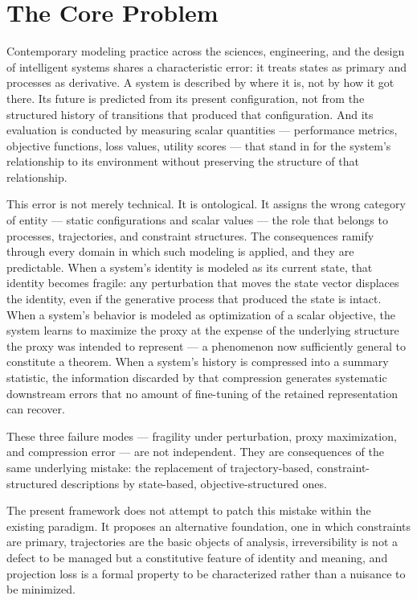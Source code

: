 \documentclass[12pt, twoside]{article}
\theoremstyle{plain}
\theoremstyle{definition}
\theoremstyle{remark}
\begin{document}
\section{The Core Problem}

Contemporary modeling practice across the sciences, engineering,
and the design of intelligent systems shares a characteristic error:
it treats states as primary and processes as derivative.
A system is described by where it is, not by how it got there.
Its future is predicted from its present configuration, not from the
structured history of transitions that produced that configuration.
And its evaluation is conducted by measuring scalar quantities
— performance metrics, objective functions, loss values, utility scores —
that stand in for the system's relationship to its environment
without preserving the structure of that relationship.

This error is not merely technical.
It is ontological.
It assigns the wrong category of entity — static configurations and scalar
values — the role that belongs to processes, trajectories, and constraint
structures.
The consequences ramify through every domain in which such modeling is
applied, and they are predictable.
When a system's identity is modeled as its current state,
that identity becomes fragile: any perturbation that moves the state
vector displaces the identity, even if the generative process that
produced the state is intact.
When a system's behavior is modeled as optimization of a scalar objective,
the system learns to maximize the proxy at the expense of the underlying
structure the proxy was intended to represent — a phenomenon now
sufficiently general to constitute a theorem.
When a system's history is compressed into a summary statistic,
the information discarded by that compression generates systematic
downstream errors that no amount of fine-tuning of the retained
representation can recover.

These three failure modes — fragility under perturbation,
proxy maximization, and compression error — are not independent.
They are consequences of the same underlying mistake: the replacement
of trajectory-based, constraint-structured descriptions by state-based,
objective-structured ones.

The present framework does not attempt to patch this mistake within
the existing paradigm.
It proposes an alternative foundation, one in which constraints are primary,
trajectories are the basic objects of analysis, irreversibility is not a
defect to be managed but a constitutive feature of identity and meaning,
and projection loss is a formal property to be characterized rather than
a nuisance to be minimized.
\end{document}
